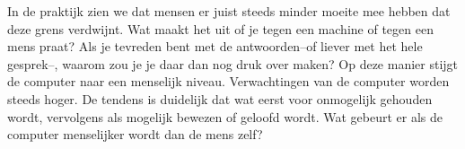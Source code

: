 \documentclass[11pt]{article}
\begin{document}
In de praktijk zien we dat mensen er juist steeds minder moeite mee hebben dat deze grens verdwijnt.
Wat maakt het uit of je tegen een machine of tegen een mens praat?
Als je tevreden bent met de antwoorden--of liever met het hele gesprek--, waarom zou je je daar dan nog druk over maken?
Op deze manier stijgt de computer naar een menselijk niveau.
Verwachtingen van de computer worden steeds hoger.
De tendens is duidelijk dat wat eerst voor onmogelijk gehouden wordt, vervolgens als mogelijk bewezen of geloofd wordt.
Wat gebeurt er als de computer menselijker wordt dan de mens zelf?
\end{document}
